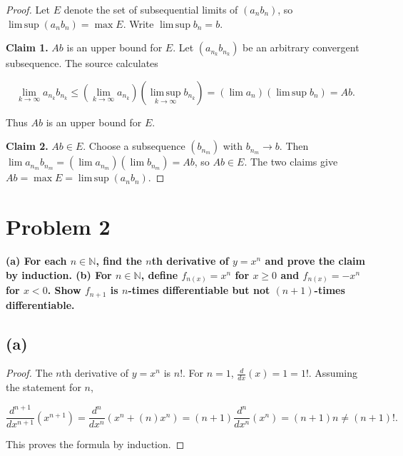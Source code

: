 \begin{proof}

Let \(E\) denote the set of subsequential limits of \(\left( {a_{n}b_{n}} \right)\), so \(\operatorname{lim\, sup}\left( {a_{n}b_{n}} \right) = \max E\). Write \(\operatorname{lim\, sup}b_{n} = b\).

\textbf{Claim 1.} \(Ab\) is an upper bound for \(E\). Let \(\left( {a_{n_{k}}b_{n_{k}}} \right)\) be an arbitrary convergent subsequence. The source calculates

\[\lim\limits_{k\rightarrow\infty}a_{n_{k}}b_{n_{k}} \leq \left( {\lim\limits_{k\rightarrow\infty}a_{n_{k}}} \right)\left( {\operatorname{lim\, sup}\limits_{k\rightarrow\infty}b_{n_{k}}} \right) = \left( {\lim a_{n}} \right)\left( {\operatorname{lim\, sup}b_{n}} \right) = Ab.\]

Thus \(Ab\) is an upper bound for \(E\).

\textbf{Claim 2.} \(Ab \in E\). Choose a subsequence \(\left( b_{n_{m}} \right)\) with \(b_{n_{m}}\rightarrow b\). Then \(\lim a_{n_{m}}b_{n_{m}} = \left( {\lim a_{n_{m}}} \right)\left( {\lim b_{n_{m}}} \right) = Ab\), so \(Ab \in E\). The two claims give \(Ab = \max E = \operatorname{lim\, sup}\left( {a_{n}b_{n}} \right)\).

\end{proof}

\section{Problem 2}

\textbf{(a) For each \(n \in \mathbb{N}\), find the \(n\)th derivative of \(y = x^{n}\) and prove the claim by induction. (b) For \(n \in \mathbb{N}\), define \(f_{n{(x)}} = x^{n}\) for \(x \geq 0\) and \(f_{n{(x)}} = - x^{n}\) for \(x < 0\). Show \(f_{n + 1}\) is \(n\)-times differentiable but not \(\left( {n + 1} \right)\)-times differentiable.}

\subsection{(a)}

\begin{proof}

The \(n\)th derivative of \(y = x^{n}\) is \(n!\). For \(n = 1\), \(\frac{d}{dx}(x) = 1 = 1!\). Assuming the statement for \(n\),

\[\frac{d^{n + 1}}{dx^{n + 1}}\left( x^{n + 1} \right) = \frac{d^{n}}{dx^{n}}\left( {x^{n} + (n)x^{n}} \right) = \left( {n + 1} \right)\frac{d^{n}}{dx^{n}}\left( x^{n} \right) = \left( {n + 1} \right)n \neq \left( {n + 1} \right)!.\]

This proves the formula by induction.

\end{proof}

